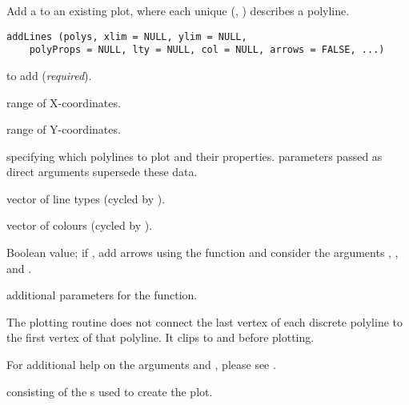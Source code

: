 \documentclass[letterpaper]{book}
\begin{document}
%
\begin{Description}\relax
Add a  to an existing plot, where each unique (,
) describes a polyline.
\end{Description}
%
\begin{Usage}
\begin{verbatim}
addLines (polys, xlim = NULL, ylim = NULL,
    polyProps = NULL, lty = NULL, col = NULL, arrows = FALSE, ...)
\end{verbatim}
\end{Usage}
%
\begin{Arguments}
\begin{ldescription}
\item[\code{polys}]  to add (\emph{required}).
\item[\code{xlim}] range of X-coordinates.
\item[\code{ylim}] range of Y-coordinates.
\item[\code{polyProps}]  specifying which polylines to plot and their
properties.   parameters passed as direct arguments
supersede these data.
\item[\code{lty}] vector of line types (cycled by ).
\item[\code{col}] vector of colours (cycled by ).
\item[\code{arrows}] Boolean value; if , add arrows using the
 function and consider the arguments ,
, and .
\item[\code{...}] additional  parameters for the
 function.
\end{ldescription}
\end{Arguments}
%
\begin{Details}\relax
The plotting routine does not connect the last vertex of each discrete
polyline to the first vertex of that polyline. It clips 
to  and  before plotting.

For additional help on the arguments  and , please
see .
\end{Details}
%
\begin{Value}
 consisting of the s used to create the plot.
\end{Value}
\end{document}
